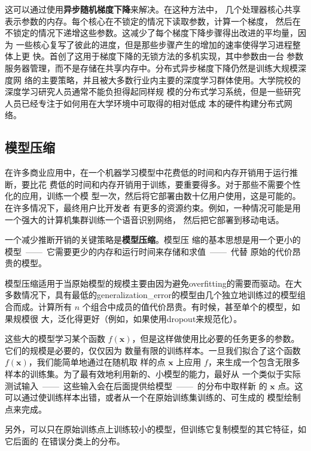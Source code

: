 这可以通过使用\textbf{异步随机梯度下降}\citep{NIPS2011_4390}来解决。在这种方法中，
几个处理器核心共享表示参数的内存。每个核心在不锁定的情况下读取参数，计算一个梯度，
然后在不锁定的情况下递增这些参数。这减少了每个梯度下降步骤得出改进的平均量，因为
一些核心复写了彼此的进度，但是那些步骤产生的增加的速率使得学习进程整体上更
快。\citet{NIPS2012_4687}首创了这用于梯度下降的无锁方法的多机实现，其中参数由一台
参数服务器管理，而不是存储在共享内存中。分布式异步梯度下降仍然是训练大规模深度网
络的主要策略，并且被大多数行业内主要的深度学习群体使用\citep{186212,
  DBLP:journals/corr/WuYSDS15}。大学院校的深度学习研究人员通常不能负担得起同样规
模的分布式学习系统，但是一些研究人员已经专注于如何用在大学环境中可取得的相对低成
本的硬件构建分布式网络\citep{coates2013deep}。

\subsection{模型压缩}
\label{subsec:model_compression}

在许多商业应用中，在一个机器学习模型中花费低的时间和内存开销用于运行推断，要比花
费低的时间和内存开销用于训练，要重要得多。对于那些不需要个性化的应用，训练一个模
型一次，然后将它部署由数十亿用户使用，这是可能的。在许多情况下，最终用户比开发者
有更多的资源约束。例如，一种情况可能是用一个强大的计算机集群训练一个语音识别网络，
然后把它部署到移动电话。

一个减少推断开销的关键策略是\textbf{模型压缩}\citep{Ungar:2006:1150402}。模型压
缩的基本思想是用一个更小的模型~——~它需要更少的内存和运行时间来存储和求值~——~代替
原始的代价昂贵的模型。

模型压缩适用于当原始模型的规模主要由因为避免\gls*{overfitting}的需要而驱动。在大
多数情况下，具有最低的\gls*{generalization_error}的模型由几个独立地训练过的模型组
合而成。计算所有 $n$ 个组合中成员的值代价昂贵。有时候，甚至单个的模型，如果规模很
大，泛化得更好（例如，如果使用\gls*{dropout}来规范化）。

这些大的模型学习某个函数
$f(\pmb{x})$，但是这样做使用比必要的任务更多的参数。它们的规模是必要的，仅仅因为
数量有限的训练样本。一旦我们拟合了这个函数$f(\pmb{x})$，我们能简单地通过在随机取
样的点 $\pmb{x}$ 上应用
$f$，来生成一个包含无限多样本的训练集。为了最有效地利用新的、小模型的能力，最好从
一个类似于实际测试输入~——~这些输入会在后面提供给模型~——~的分布中取样新
的 $\pmb{x}$ 点。这可以通过使训练样本出错，或者从一个在原始训练集训练的、可生成的
模型绘制点来完成。

另外，可以只在原始训练点上训练较小的模型，但训练它复制模型的其它特征，如它后面的
在错误分类上的分布。

